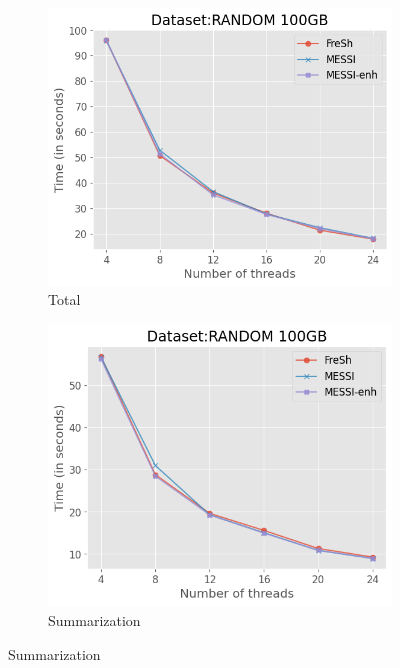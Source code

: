 \begin{figure}[htbp]
    \centering
    \begin{subfigure}{0.48\textwidth}
        \includegraphics[width=\textwidth]{figures/Experiments/fresh-messi-threads-random-total}
        \caption{Total}
        \label{fig:eval:fresh-messi-threads:random:total-from-4}
    \end{subfigure}    
    \begin{subfigure}{0.48\textwidth}
        \includegraphics[width=\textwidth]{figures/Experiments/fresh-messi-threads-random-summarization}
        \caption{Summarization}
        \label{fig:eval:fresh-messi-threads:random:recbuf-from-4}
    \end{subfigure}    


\end{figure}
